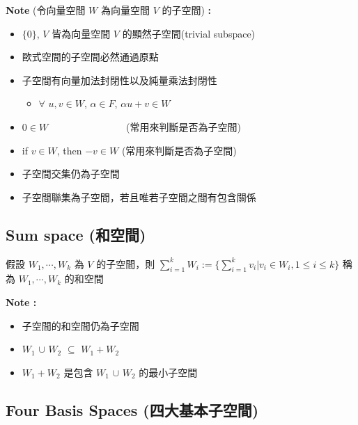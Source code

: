 \documentclass[
]{book}
\providecommand{\tightlist}{%
  \setlength{\itemsep}{0pt}\setlength{\parskip}{0pt}}
\begin{document}
\textbf{Note} (令向量空間 \(W\) 為向量空間 \(V\) 的子空間) \textbf{:}

\begin{itemize}
\tightlist
\item
  \(\{0\}\), \(V\) 皆為向量空間 \(V\) 的顯然子空間(trivial subspace)
\item
  歐式空間的子空間必然通過原點
\item
  子空間有向量加法封閉性以及純量乘法封閉性

  \begin{itemize}
  \tightlist
  \item
    \(\forall\) \(u,v\in W\), \(\alpha \in F\), \(\alpha u +v \in W\)
  \end{itemize}
\item
  \(0 \in W\)        (常用來判斷是否為子空間)
\item
  if \(v\in W\), then \(-v \in W\) (常用來判斷是否為子空間)
\item
  子空間交集仍為子空間
\item
  子空間聯集為子空間，若且唯若子空間之間有包含關係
\end{itemize}

\hypertarget{sum-space-ux548cux7a7aux9593}{%
\subsection{Sum space (和空間)}\label{sum-space-ux548cux7a7aux9593}}

假設 \(W_1, \cdots, W_k\) 為 \(V\) 的子空間，則 \(\displaystyle \sum_{i = 1}^k W_i := \{\sum_{i=1}^kv_i|v_i \in W_i, 1 \leq i \leq k\}\) 稱為 \(W_1, \cdots, W_k\) 的和空間

\textbf{Note :}

\begin{itemize}
\tightlist
\item
  子空間的和空間仍為子空間
\item
  \(W_1\) \(\cup\) \(W_2\) \(\subseteq\) \(W_1 + W_2\)
\item
  \(W_1 + W_2\) 是包含 \(W_1\) \(\cup\) \(W_2\) 的最小子空間
\end{itemize}

\hypertarget{four-basis-spaces-ux56dbux5927ux57faux672cux5b50ux7a7aux9593}{%
\subsection{Four Basis Spaces (四大基本子空間)}\label{four-basis-spaces-ux56dbux5927ux57faux672cux5b50ux7a7aux9593}}
\end{document}
